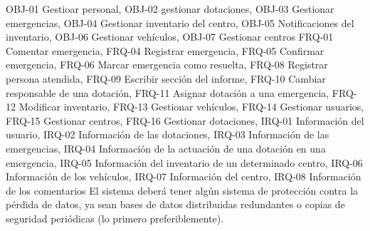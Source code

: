 {\reportauthors}
{}
{OBJ-01 Gestioar personal, OBJ-02 gestionar dotaciones, OBJ-03 Gestionar emergencias, OBJ-04 Gestionar inventario del centro, OBJ-05 Notificaciones del inventario, OBJ-06 Gestionar vehículos, OBJ-07 Gestionar centros}
{FRQ-01 Comentar emergencia, FRQ-04 Registrar emergencia, FRQ-05 Confirmar emergencia, FRQ-06 Marcar emergencia como resuelta, FRQ-08 Registrar persona atendida, FRQ-09 Escribir sección del informe, FRQ-10 Cambiar responsable de una dotación, FRQ-11 Asignar dotación a una emergencia, FRQ-12 Modificar inventario, FRQ-13 Gestionar vehículos, FRQ-14 Gestionar usuarios, FRQ-15 Gestionar centros, FRQ-16 Gestionar dotaciones, IRQ-01 Información del usuario, IRQ-02 Información de las dotaciones, IRQ-03 Información de las emergencias, IRQ-04 Información de la actuación de una dotación en una emergencia, IRQ-05 Información del inventario de un determinado centro, IRQ-06 Información de los vehículos, IRQ-07 Información del centro, IRQ-08 Información de los comentarios}
{El sistema deberá tener algún sistema de protección contra la pérdida de datos, ya sean bases de datos distribuidas redundantes o copias de seguridad periódicas (lo primero preferiblemente).}

